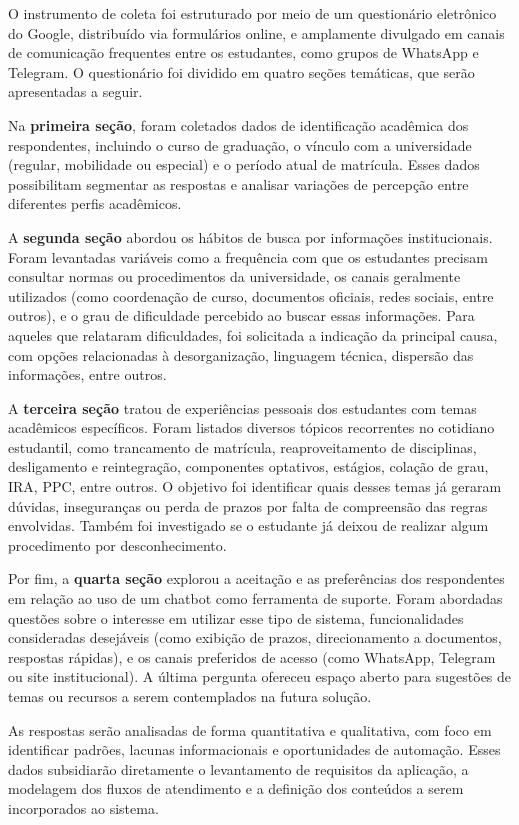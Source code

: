 O instrumento de coleta foi estruturado por meio de um questionário eletrônico do Google, distribuído via formulários online, e amplamente divulgado em canais de comunicação frequentes entre os estudantes, como grupos de WhatsApp e Telegram. O questionário foi dividido em quatro seções temáticas, que serão apresentadas a seguir.

Na \textbf{primeira seção}, foram coletados dados de identificação acadêmica dos respondentes, incluindo o curso de graduação, o vínculo com a universidade (regular, mobilidade ou especial) e o período atual de matrícula. Esses dados possibilitam segmentar as respostas e analisar variações de percepção entre diferentes perfis acadêmicos.

A \textbf{segunda seção} abordou os hábitos de busca por informações institucionais. Foram levantadas variáveis como a frequência com que os estudantes precisam consultar normas ou procedimentos da universidade, os canais geralmente utilizados (como coordenação de curso, documentos oficiais, redes sociais, entre outros), e o grau de dificuldade percebido ao buscar essas informações. Para aqueles que relataram dificuldades, foi solicitada a indicação da principal causa, com opções relacionadas à desorganização, linguagem técnica, dispersão das informações, entre outros.

A \textbf{terceira seção} tratou de experiências pessoais dos estudantes com temas acadêmicos específicos. Foram listados diversos tópicos recorrentes no cotidiano estudantil, como trancamento de matrícula, reaproveitamento de disciplinas, desligamento e reintegração, componentes optativos, estágios, colação de grau, IRA, PPC, entre outros. O objetivo foi identificar quais desses temas já geraram dúvidas, inseguranças ou perda de prazos por falta de compreensão das regras envolvidas. Também foi investigado se o estudante já deixou de realizar algum procedimento por desconhecimento.

Por fim, a \textbf{quarta seção} explorou a aceitação e as preferências dos respondentes em relação ao uso de um chatbot como ferramenta de suporte. Foram abordadas questões sobre o interesse em utilizar esse tipo de sistema, funcionalidades consideradas desejáveis (como exibição de prazos, direcionamento a documentos, respostas rápidas), e os canais preferidos de acesso (como WhatsApp, Telegram ou site institucional). A última pergunta ofereceu espaço aberto para sugestões de temas ou recursos a serem contemplados na futura solução.

As respostas serão analisadas de forma quantitativa e qualitativa, com foco em identificar padrões, lacunas informacionais e oportunidades de automação. Esses dados subsidiarão diretamente o levantamento de requisitos da aplicação, a modelagem dos fluxos de atendimento e a definição dos conteúdos a serem incorporados ao sistema.

